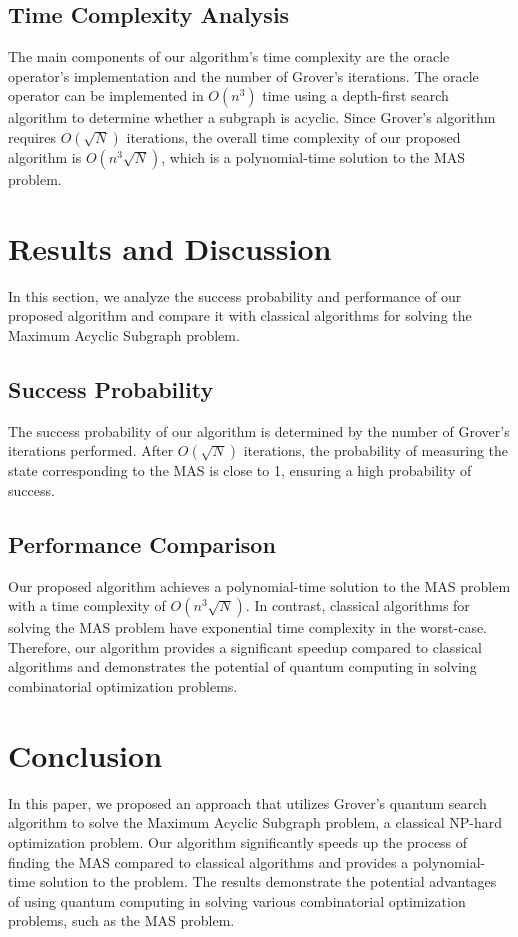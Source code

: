\subsection{Time Complexity Analysis}
The main components of our algorithm's time complexity are the oracle operator's implementation and the number of Grover's iterations. The oracle operator can be implemented in $O(n^3)$ time using a depth-first search algorithm to determine whether a subgraph is acyclic. Since Grover's algorithm requires $O(\sqrt{N})$ iterations, the overall time complexity of our proposed algorithm is $O(n^3 \sqrt{N})$, which is a polynomial-time solution to the MAS problem.

\section{Results and Discussion}
\label{sec:results}
In this section, we analyze the success probability and performance of our proposed algorithm and compare it with classical algorithms for solving the Maximum Acyclic Subgraph problem.

\subsection{Success Probability}
The success probability of our algorithm is determined by the number of Grover's iterations performed. After $O(\sqrt{N})$ iterations, the probability of measuring the state corresponding to the MAS is close to 1, ensuring a high probability of success.

\subsection{Performance Comparison}
Our proposed algorithm achieves a polynomial-time solution to the MAS problem with a time complexity of $O(n^3 \sqrt{N})$. In contrast, classical algorithms for solving the MAS problem have exponential time complexity in the worst-case. Therefore, our algorithm provides a significant speedup compared to classical algorithms and demonstrates the potential of quantum computing in solving combinatorial optimization problems.

\section{Conclusion}
\label{sec:conclusion}
In this paper, we proposed an approach that utilizes Grover's quantum search algorithm to solve the Maximum Acyclic Subgraph problem, a classical NP-hard optimization problem. Our algorithm significantly speeds up the process of finding the MAS compared to classical algorithms and provides a polynomial-time solution to the problem. The results demonstrate the potential advantages of using quantum computing in solving various combinatorial optimization problems, such as the MAS problem.


